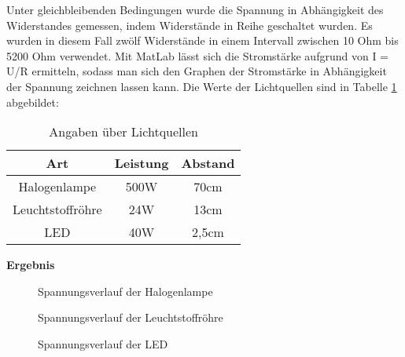         \par Unter gleichbleibenden Bedingungen wurde die Spannung in Abhängigkeit des Widerstandes gemessen, indem Widerstände in Reihe geschaltet wurden. Es wurden in diesem Fall zwölf Widerstände in einem Intervall zwischen 10 Ohm bis 5200 Ohm verwendet. Mit MatLab lässt sich die Stromstärke aufgrund von I = U/R ermitteln, sodass man sich den Graphen der Stromstärke in Abhängigkeit der Spannung zeichnen lassen kann.
        Die Werte der Lichtquellen sind in Tabelle \ref{tab:Werte} abgebildet:
        \begin{table}[htb]
        	\centering
        	\caption{Angaben über Lichtquellen}
        	\label{tab:Werte}
        	\begin{tabular}{ccc}
        		\toprule
        		Art & Leistung & Abstand \\
        		\midrule
        		Halogenlampe & 500W  & 70cm \\
        		Leuchtstoffröhre & 24W  & 13cm \\
        		LED & 40W & 2,5cm \\
        		\bottomrule
        	\end{tabular}
        \end{table}
        
        \vspace{5mm}
        \textbf{Ergebnis}
        \newline
        
        \begin{figure}[H]
            \def\svgwidth{\textwidth}
            
            
            \caption{Spannungsverlauf der Halogenlampe}
        \end{figure}
        
        \begin{figure}[H]
            \def\svgwidth{\textwidth}
            
            
            \caption{Spannungsverlauf der Leuchtstoffröhre}
        \end{figure}
        
        \begin{figure}[H]
            \def\svgwidth{\textwidth}
            
            
            \caption{Spannungsverlauf der LED}
        \end{figure}


